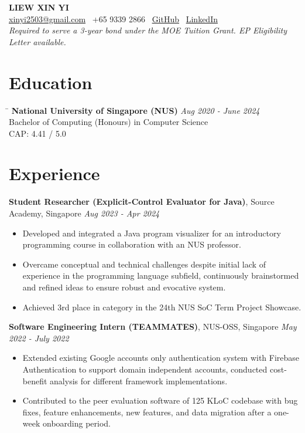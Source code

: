 \documentclass[a4paper,10pt]{article}
\begin{document}
\begin{center}
    \textbf{\huge LIEW XIN YI} \\
    \href{mailto:xinyi2503@gmail.com}{xinyi2503@gmail.com} \textbar\ +65 9339 2866 \textbar\ \href{https://github.com/xyliew25}{GitHub} \textbar\ \href{https://linkedin.com/in/xyliew}{LinkedIn} \\
    \vspace{1em}
    \emph{Required to serve a 3-year bond under the MOE Tuition Grant. EP Eligibility Letter available.}
\end{center}

\section*{Education}
\begin{tabbing}
\hspace{4in} \= \hspace{1in} \kill
\textbf{National University of Singapore (NUS)} \> \textit{Aug 2020 - June 2024} \\
Bachelor of Computing (Honours) in Computer Science \\
CAP: 4.41 / 5.0 \\
\end{tabbing}

\section*{Experience}
\textbf{Student Researcher (Explicit-Control Evaluator for Java)}, Source Academy, Singapore \hfill \textit{Aug 2023 - Apr 2024}
\begin{itemize}[leftmargin=*]
    \item Developed and integrated a Java program visualizer for an introductory programming course in collaboration with an NUS professor.
    \item Overcame conceptual and technical challenges despite initial lack of experience in the programming language subfield, continuously brainstormed and refined ideas to ensure robust and evocative system.
    \item Achieved 3rd place in category in the 24th NUS SoC Term Project Showcase.
\end{itemize}

\textbf{Software Engineering Intern (TEAMMATES)}, NUS-OSS, Singapore \hfill \textit{May 2022 - July 2022}
\begin{itemize}[leftmargin=*]
    \item Extended existing Google accounts only authentication system with Firebase Authentication to support domain independent accounts, conducted cost-benefit analysis for different framework implementations.
    \item Contributed to the peer evaluation software of 125 KLoC codebase with bug fixes, feature enhancements, new features, and data migration after a one-week onboarding period.
\end{itemize}
\end{document}

